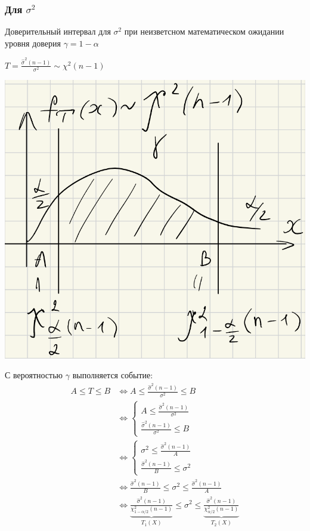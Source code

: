 \documentclass{article}
\begin{document}
\subsubsection{Для $\sigma^2$}
Доверительный интервал для $\sigma^2$ при неизветсном математическом ожидании уровня доверия $\gamma=1-\alpha$

$T=\displaystyle\frac{\widehat{\sigma}^2(n-1)}{\sigma^2}\sim\chi^2(n-1)$

\begin{center}
    \includegraphics[width=0.5\linewidth]{confidence_interval2.png}
\end{center}
С вероятностью $\gamma$ выполняется событие:
\begin{equation*}
    \begin{aligned}
        A\leqslant T\leqslant B&\Longleftrightarrow A\leqslant \frac{\widehat{\sigma}^2(n-1)}{\sigma^2}\leqslant B\\
        &\Longleftrightarrow \begin{cases}
            A\leqslant\frac{\widehat{\sigma}^2(n-1)}{\sigma^2}\\
            \frac{\widehat{\sigma}^2(n-1)}{\sigma^2}\leqslant B
        \end{cases}\\
        &\Longleftrightarrow\begin{cases}
            \sigma^2\leqslant\frac{\widehat{\sigma}^2(n-1)}{A}\\
            \frac{\widehat{\sigma}^2(n-1)}{B}\leqslant\sigma^2
        \end{cases}\\
        &\Longleftrightarrow\frac{\widehat{\sigma}^2(n-1)}{B}\leqslant\sigma^2\leqslant\frac{\widehat{\sigma}^2(n-1)}{A}\\
        &\Longleftrightarrow\underbrace{\frac{\widehat{\sigma}^2(n-1)}{\chi^2_{1-\alpha/2}(n-1)}}_{T_1(X)}\leqslant\sigma^2\leqslant\underbrace{\frac{\widehat{\sigma}^2(n-1)}{\chi^2_{\alpha/2}(n-1)}}_{T_2(X)}
    \end{aligned}
\end{equation*}
\end{document}
